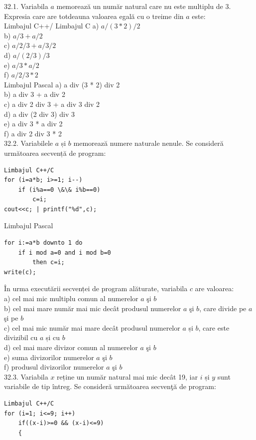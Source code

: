 \begin{itemize}
\begin{enumerate}
32.1. Variabila $a$ memorează un număr natural care nu este multiplu de 3. Expresia care are totdeauna valoarea egală cu o treime din $a$ este:
\\
Limbajul C++/ Limbajul C
a) $a / (3 * 2) / 2$
\\
b) $a / 3 + a / 2$
\\
c) $a / 2 / 3 + a / 3 / 2$
\\
d) $a / (2 / 3) / 3$
\\
e) $a / 3 * a / 2$
\\
f) $a / 2 / 3 * 2$
\\
Limbajul Pascal
a) a div (3 * 2) div 2
\\
b) a div 3 + a div 2
\\
c) a div 2 div 3 + a div 3 div 2
\\
d) a div (2 div 3) div 3
\\
e) a div 3 * a div 2
\\
f) a div 2 div 3 * 2
\\
32.2. Variabilele $a$ și $b$ memorează numere naturale nenule. Se consideră următoarea secvență de program:
\begin{verbatim}
Limbajul C++/C
for (i=a*b; i>=1; i--)
    if (i%a==0 \&\& i%b==0)
        c=i;
cout<<c; | printf("%d",c);
\end{verbatim}
Limbajul Pascal
\begin{verbatim}
for i:=a*b downto 1 do
    if i mod a=0 and i mod b=0 
        then c=i;
write(c);
\end{verbatim}
În urma executării secvenței de program alăturate, variabila $c$ are valoarea:
\\
a) cel mai mic multiplu comun al numerelor $a$ şi $b$
\\
b) cel mai mare număr mai mic decât produsul numerelor $a$ şi $b$, care divide pe $a$ şi pe $b$
\\
c) cel mai mic număr mai mare decât produsul numerelor $a$ și $b$, care este divizibil cu $a$ și cu $b$
\\
d) cel mai mare divizor comun al numerelor $a$ şi $b$
\\
e) suma divizorilor numerelor $a$ şi $b$
\\
f) produsul divizorilor numerelor $a$ şi $b$
\\
32.3. Variabila $x$ reține un număr natural mai mic decât 19, iar $i$ și $y$ sunt variabile de tip întreg. Se consideră următoarea secvenţă de program:
\begin{verbatim}
Limbajul C++/C
for (i=1; i<=9; i++)
    if((x-i)>=0 && (x-i)<=9)
    {

\end{verbatim}
\end{enumerate}
\end{itemize}
